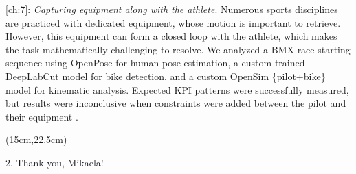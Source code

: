 \vskip 0.4cm
\noindent\autoref{ch:7}: \emph{Capturing equipment along with the athlete}. \newline
Numerous sports disciplines are practiced with dedicated equipment, whose motion is important to retrieve. However, this equipment can form a closed loop with the athlete, which makes the task mathematically challenging to resolve. We analyzed a BMX race starting sequence using OpenPose for human pose estimation, a custom trained DeepLabCut model for bike detection, and a custom OpenSim \{pilot+bike\} model for kinematic analysis. Expected KPI patterns were successfully measured, but results were inconclusive when constraints were added between the pilot and their equipment \cite{Pagnon2022e}.


\begin{textblock*}{10cm}(15cm,22.5cm) %
      \begin{turn}{0}  
            \scriptsize \emojiegg
            \tiny 2. Thank you, Mikaela! 
            \scriptsize \emojibell
      \end{turn}
\end{textblock*}




